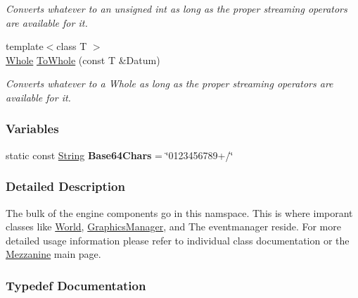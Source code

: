 \begin{DoxyCompactItemize}
\begin{DoxyCompactList}\small\item\em Converts whatever to an unsigned int as long as the proper streaming operators are available for it. \end{DoxyCompactList}\item 
{\footnotesize template$<$class T $>$ }\\\hyperlink{namespaceMezzanine_adcbb6ce6d1eb4379d109e51171e2e493}{Whole} \hyperlink{namespaceMezzanine_ad558d586f0c8b6a9b8eee3e43010619d}{To\-Whole} (const T \&Datum)
\begin{DoxyCompactList}\small\item\em Converts whatever to a Whole as long as the proper streaming operators are available for it. \end{DoxyCompactList}\end{DoxyCompactItemize}
\subsubsection*{Variables}
\begin{DoxyCompactItemize}
\item 
\hypertarget{namespaceMezzanine_a5b5e5f1152388f1ed1c7ade7ddea228f}{static const \hyperlink{namespaceMezzanine_acf9fcc130e6ebf08e3d8491aebcf1c86}{String} {\bfseries Base64\-Chars} = \char`\"{}0123456789+/\char`\"{}}\label{namespaceMezzanine_a5b5e5f1152388f1ed1c7ade7ddea228f}

\end{DoxyCompactItemize}


\subsubsection{Detailed Description}
The bulk of the engine components go in this namspace. This is where imporant classes like \hyperlink{classMezzanine_1_1World}{World}, \hyperlink{classMezzanine_1_1GraphicsManager}{Graphics\-Manager}, and The eventmanager reside. For more detailed usage information please refer to individual class documentation or the \hyperlink{index}{Mezzanine} main page. 

\subsubsection{Typedef Documentation}
\hypertarget{namespaceMezzanine_ad5147a419db7627ee552a2b582f1052d}{
\paragraph[{Character}]{}}\label{namespaceMezzanine_ad5147a419db7627ee552a2b582f1052d}


